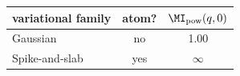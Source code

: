 \begin{tabular}{lcc}
\toprule
variational family & atom? & $\MI_{\mathrm{pow}}(q,0)$ \\
\midrule
Gaussian & no & 1.00 \\
Spike-and-slab & yes & $\infty$ \\
\bottomrule
\end{tabular}
